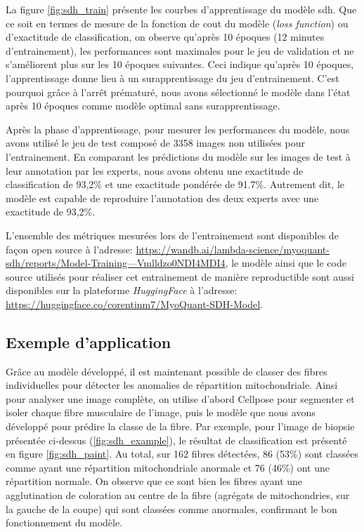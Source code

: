 La figure \ref{fig:sdh_train} présente les courbes d'apprentissage du modèle \gls{sdh}. Que ce soit en termes de mesure de la fonction de cout du modèle (\textit{loss function}) ou d'exactitude de classification, on observe qu'après 10 époques (12 minutes d'entrainement), les performances sont maximales pour le jeu de validation et ne s'améliorent plus sur les 10 époques suivantes. Ceci indique qu'après 10 époques, l'apprentissage donne lieu à un surapprentissage du jeu d'entrainement. C'est pourquoi grâce à l'arrêt prématuré, nous avons sélectionné le modèle dans l'état après 10 époques comme modèle optimal sans surapprentissage.

Après la phase d'apprentissage, pour mesurer les performances du modèle, nous avons utilisé le jeu de test composé de 3358 images non utilisées pour l'entrainement. En comparant les prédictions du modèle sur les images de test à leur annotation par les experts, nous avons obtenu une exactitude de classification de 93,2\% et une exactitude pondérée de 91.7\%. Autrement dit, le modèle est capable de reproduire l'annotation des deux experts avec une exactitude de 93,2\%.

L'ensemble des métriques mesurées lors de l'entrainement sont disponibles de façon open source à l'adresse: \href{https://wandb.ai/lambda-science/myoquant-sdh/reports/Model-Training---Vmlldzo0NDI4MDI4}{https://wandb.ai/lambda-science/myoquant-sdh/reports/Model-Training---Vmlldzo0NDI4MDI4}, le modèle ainsi que le code source utilisés pour réaliser cet entrainement de manière reproductible sont aussi disponibles sur la plateforme \textit{HuggingFace} à l'adresse: \href{https://huggingface.co/corentinm7/MyoQuant-SDH-Model}{https://huggingface.co/corentinm7/MyoQuant-SDH-Model}.

\subsection{Exemple d'application}
Grâce au modèle développé, il est maintenant possible de classer des fibres individuelles pour détecter les anomalies de répartition mitochondriale. Ainsi pour analyser une image complète, on utilise d'abord Cellpose pour segmenter et isoler chaque fibre musculaire de l'image, puis le modèle que nous avons développé pour prédire la classe de la fibre. Par exemple, pour l'image de biopsie présentée ci-dessus (\ref{fig:sdh_example}), le résultat de classification est présenté en figure \ref{fig:sdh_paint}. Au total, sur 162 fibres détectées, 86 (53\%) sont classées comme ayant une répartition mitochondriale anormale et 76 (46\%) ont une répartition normale. On observe que ce sont bien les fibres ayant une agglutination de coloration au centre de la fibre (agrégats de mitochondries, sur la gauche de la coupe) qui sont classées comme anormales, confirmant le bon fonctionnement du modèle.

